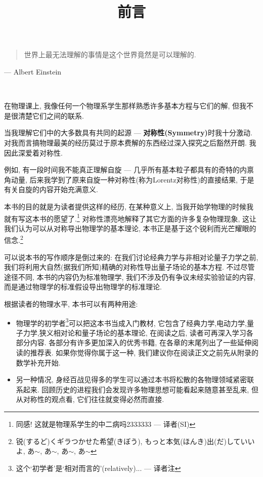 \documentclass[hyperref, UTF8]{ctexart}
\title{前言}
\begin{document}
	
\maketitle

\begin{quote}
世界上最无法理解的事情是这个世界竟然是可以理解的.
\end{quote}
--- Albert Einstein

\ 

在物理课上, 我像任何一个物理系学生那样熟悉许多基本方程与它们的解, 但我不是很清楚它们之间的联系.

当我理解它们中的大多数具有共同的起源 --- \textbf{对称性(Symmetry)}时我十分激动. 对我而言搞物理最美的经历莫过于原本费解的东西经过深入探究之后豁然开朗. 我因此深爱着对称性.

例如, 有一段时间我不能真正理解自旋 --- 几乎所有基本粒子都具有的奇特的内禀角动量, 后来我学到了原来自旋一种对称性(称为Lorentz对称性)的直接结果, 于是有关自旋的内容开始充满意义.

本书的目的就是为读者提供这样的经历, 在某种意义上, 当我开始学物理的时候我就有写这本书的愿望了.\footnote{同感! 这就是物理系学生的中二病吗2333333 --- 译者(SI)} 对称性漂亮地解释了其它方面的许多复杂物理现象, 这让我们认为可以从对称导出物理学的基本理论, 本书正是基于这个锐利而光芒耀眼的信念.\footnote{锐(するど)くギラつかせた希望(きぼう), もっと本気(ほんき)出(だ)していいよ, あ$\sim$, あ$\sim$, あ$\sim$, あ$\sim$}

可以说本书的写作顺序是倒过来的: 在我们讨论经典力学与非相对论量子力学之前, 我们将利用大自然(据我们所知)精确的对称性导出量子场论的基本方程. 不过尽管途径不同, 本书的内容仍为标准物理学, 我们不涉及仍有争议未经实验验证的内容, 而是通过物理学的标准假设导出物理学的标准理论.

根据读者的物理水平, 本书可以有两种用途:
\begin{itemize}
	\item 物理学的初学者\footnote{这个`初学者'是`相对而言的'(relatively)... --- 译者注}可以把这本书当成入门教材, 它包含了经典力学,电动力学,量子力学,狭义相对论和量子场论的基本理论, 在阅读之后, 读者可再深入学习各部分内容. 各部分有许多更加深入的优秀书籍, 在各章的末尾列出了一些延伸阅读的推荐表. 如果你觉得你属于这一种, 我们建议你在阅读正文之前先从附录的数学补充开始.
	\item 
	另一种情况, 身经百战见得多的学生可以通过本书将松散的各物理领域紧密联系起来. 回顾历史的进程我们会发现许多物理思想可能看起来随意甚至乱来, 但从对称性的观点看, 它们往往就变得必然而直接.
\end{itemize}
\end{document}
